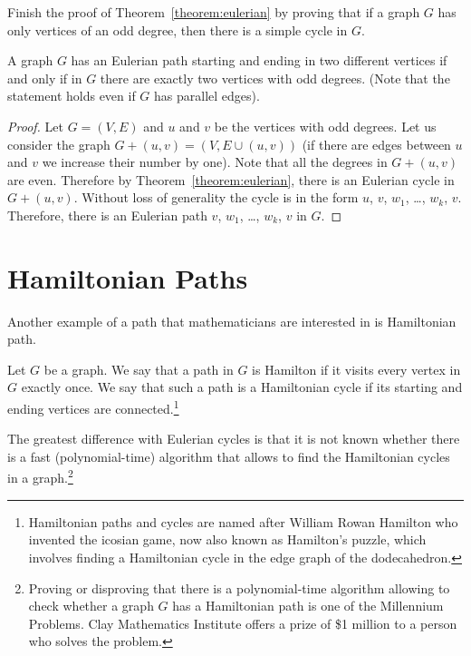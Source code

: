 \begin{exercise}
  Finish the proof of Theorem~\ref{theorem:eulerian} by proving that if a graph
  $G$ has only vertices of an odd degree, then there is a simple cycle in $G$.
\end{exercise}

\begin{corollary}
  A graph $G$ has an Eulerian path starting and ending in two different
  vertices if and only if in $G$ there are exactly two vertices with odd
  degrees.
  (Note that the statement holds even if $G$ has parallel edges).
\end{corollary}
\begin{proof}
  Let $G = (V, E)$ and $u$ and $v$ be the vertices with odd degrees. Let us
  consider the graph $G + (u, v) = (V, E \cup (u, v))$ (if there are edges
  between $u$ and $v$ we increase their number by one). Note that all
  the degrees in $G + (u, v)$ are even.
  Therefore by Theorem~\ref{theorem:eulerian}, there is an Eulerian cycle in
  $G + (u, v)$. Without loss of generality the cycle is in the form $u$, $v$,
  $w_1$, \dots, $w_k$, $v$. Therefore, there is an Eulerian path $v$,
  $w_1$, \dots, $w_k$, $v$ in $G$.
\end{proof}

\section{Hamiltonian Paths}

Another example of a path that mathematicians are interested in is Hamiltonian
path.
\begin{definition}
  Let $G$ be a graph. We say that a path in $G$ is Hamilton
  if it visits every vertex in $G$ exactly once. We say that such a path is a
  Hamiltonian cycle if its starting and ending vertices are
  connected.\footnote{%
    Hamiltonian paths and cycles are named after William Rowan Hamilton who
    invented the icosian game, now also known as Hamilton's puzzle, which
    involves finding a Hamiltonian cycle in the edge graph of the dodecahedron.
  }
\end{definition}

The greatest difference with Eulerian cycles is that it is not known whether
there is a fast (polynomial-time) algorithm that allows to find the Hamiltonian
cycles in a graph.\footnote{%
  Proving or disproving that there is a polynomial-time algorithm allowing to
  check whether a graph $G$ has a Hamiltonian path is one of the Millennium
  Problems. Clay Mathematics Institute offers a prize of \$1 million to a person
  who solves the problem.
}

